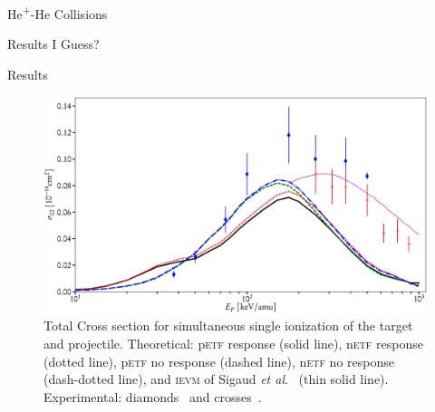 \documentclass[letterpaper, 11 pt]{report}
\begin{document}
\begin{chapter}{\texorpdfstring{He\textsuperscript{+}}{He+}-He Collisions \label{chap:hephe}}
\begin{section}{Results I Guess? \label{sec:hephe-disc}}
\begin{subsection}{Results \label{sec:hephe-res}}
         \begin{figure}[t]
            \centering
            \includegraphics[width = \linewidth]{./images/hephe-cross/HepHe-102.eps}
            \caption[Total Cross section for simultaneous single ionization of the target and projectile
                     in He\textsuperscript{+}-He collisions.]
                    {Total Cross section for simultaneous single ionization of the target and
                     projectile.
                     Theoretical: p\textsc{etf} response (solid line), n\textsc{etf} response (dotted
                                  line),
                                  p\textsc{etf} no response (dashed line), n\textsc{etf} no response
                                  (dash-dotted line), and
                                  \textsc{ievm} of Sigaud \textit{et al}.~\cite{SM-03} (thin solid line).
                     Experimental: diamonds~\cite{Dub-89} and crosses~\cite{SSMSM-11}.
                     \label{fig:cs102}}
         \end{figure}
 

\end{subsection}
\end{section}
\end{chapter}
\end{document}
